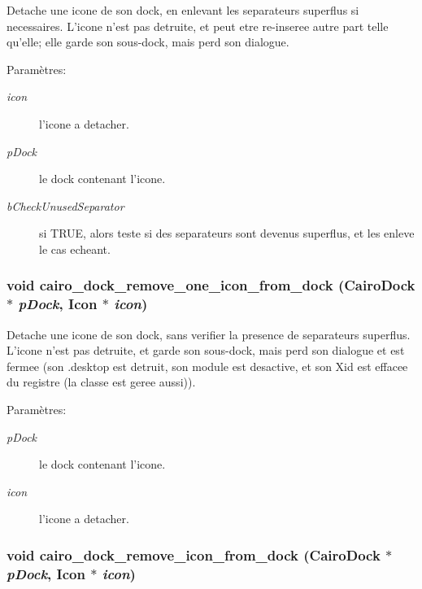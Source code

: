 Detache une icone de son dock, en enlevant les separateurs superflus si necessaires. L'icone n'est pas detruite, et peut etre re-inseree autre part telle qu'elle; elle garde son sous-dock, mais perd son dialogue. \begin{Desc}
\item[Paramètres:]
\begin{description}
\item[{\em icon}]l'icone a detacher. \item[{\em pDock}]le dock contenant l'icone. \item[{\em bCheckUnusedSeparator}]si TRUE, alors teste si des separateurs sont devenus superflus, et les enleve le cas echeant. \end{description}
\end{Desc}
\subsubsection{\setlength{\rightskip}{0pt plus 5cm}void cairo\_\-dock\_\-remove\_\-one\_\-icon\_\-from\_\-dock ({\bf CairoDock} $\ast$ {\em pDock}, {\bf Icon} $\ast$ {\em icon})}\label{cairo-dock-icons_8h_d66a0e6a2a1922353b51d07c8f07423e}


Detache une icone de son dock, sans verifier la presence de separateurs superflus. L'icone n'est pas detruite, et garde son sous-dock, mais perd son dialogue et est fermee (son .desktop est detruit, son module est desactive, et son Xid est effacee du registre (la classe est geree aussi)). \begin{Desc}
\item[Paramètres:]
\begin{description}
\item[{\em pDock}]le dock contenant l'icone. \item[{\em icon}]l'icone a detacher. \end{description}
\end{Desc}
\subsubsection{\setlength{\rightskip}{0pt plus 5cm}void cairo\_\-dock\_\-remove\_\-icon\_\-from\_\-dock ({\bf CairoDock} $\ast$ {\em pDock}, {\bf Icon} $\ast$ {\em icon})}\label{cairo-dock-icons_8h_7a43c7c13c5d65eca70bb4dd5161520f}


